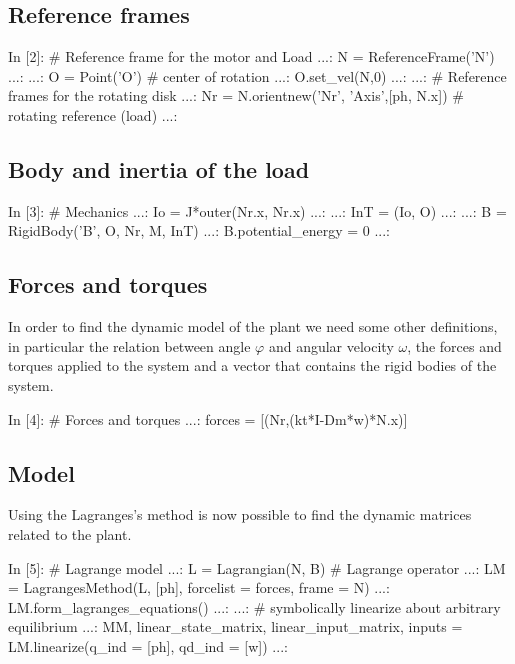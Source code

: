 \subsection{Reference frames}
\begin{code}
In [2]: # Reference frame for the motor and Load
   ...: N = ReferenceFrame('N')
   ...: 
   ...: O = Point('O')		# center of rotation
   ...: O.set_vel(N,0)
   ...: 
   ...: # Reference frames for the rotating disk
   ...: Nr = N.orientnew('Nr', 'Axis',[ph, N.x])    # rotating reference (load)
   ...: 
\end{code}

\subsection{Body and inertia of the load}
\begin{code}
In [3]: # Mechanics
   ...: Io = J*outer(Nr.x, Nr.x)
   ...: 
   ...: InT = (Io, O)
   ...: 
   ...: B = RigidBody('B', O, Nr, M, InT)
   ...: B.potential_energy = 0
   ...: 
\end{code}

\subsection{Forces and torques}
In order to find the dynamic model of the plant we need some other definitions, 
in particular the relation between angle $\varphi$ and angular velocity 
$\omega$, the forces and torques applied to the system and a vector that 
contains the rigid bodies of the system.

\begin{code}
In [4]: # Forces and torques
   ...: forces = [(Nr,(kt*I-Dm*w)*N.x)]
\end{code}

\subsection{Model}

Using the Lagranges's method is now possible to find the dynamic matrices related to the plant.

\begin{code}
In [5]: # Lagrange model
   ...: L = Lagrangian(N, B)    # Lagrange operator
   ...: LM = LagrangesMethod(L, [ph], forcelist = forces, frame = N)
   ...: LM.form_lagranges_equations()
   ...: 
   ...: # symbolically linearize about arbitrary equilibrium
   ...: MM, linear_state_matrix, linear_input_matrix, inputs = LM.linearize(q_ind = [ph], qd_ind = [w])
   ...: 
\end{code}

